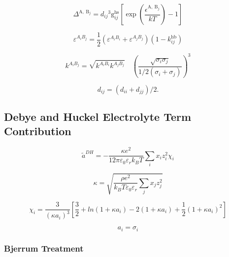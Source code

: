 \documentclass[12pt, letterpaper]{article}
\begin{document}
\begin{equation}
\Delta^{\mathrm{A}, \mathrm{~B}_j}=d_{i j}{ }^3 \mathrm{g}_{i j}^{\mathrm{hs}}\left[\exp \left(\frac{\epsilon^{\mathrm{A}, \mathrm{~B}_j}}{k T}\right)-1\right]
\end{equation}

\begin{equation}
\varepsilon^{A_{i}B_{j}}=\frac{1}{2}(\varepsilon^{A_{i}B_{i}}+\varepsilon^{A_{j}B_{j}})(1-k_{ij}^{\mathrm{hb}})
\end{equation}

\begin{equation}
k^{A_iB_j}=\sqrt{k^{A_iB_i}k^{A_jB_j}}\quad\left(\frac{\sqrt{\sigma_i\sigma_j}}{1/2(\sigma_i+\sigma_j)}\right)^3
\end{equation}

\begin{equation}
d_{i j}=\left(d_{i i}+d_{j j}\right) / 2 .
\end{equation}

\subsection{Debye and Huckel Electrolyte Term Contribution}

\cite{Bulow2019}

\begin{equation}
\tilde{a}^{DH}=-\frac{\kappa e^{2}}{12\pi\varepsilon_{0}\varepsilon_{r}k_{B}T}\sum_{i}x_{i}z_{i}^{2}\chi_{i}
\end{equation}

\begin{equation}
\kappa=\sqrt{\frac{\rho e^{2}}{k_{B}T\varepsilon_{0}\varepsilon_{r}}\sum_{j}x_{j}z_{j}^{2}}
\end{equation}

\begin{equation}
\chi_i=\frac{3}{\left(\kappa a_i\right)^3}\left[\frac{3}{2}+ln(1+\kappa a_i)-2(1+\kappa a_i)+\frac{1}{2}\left(1+\kappa a_i\right)^2\right]
\end{equation}

\begin{equation}
a_i=\sigma _i
\end{equation}

\subsubsection{Bjerrum Treatment}

\cite{Bulow2021}
\end{document}
